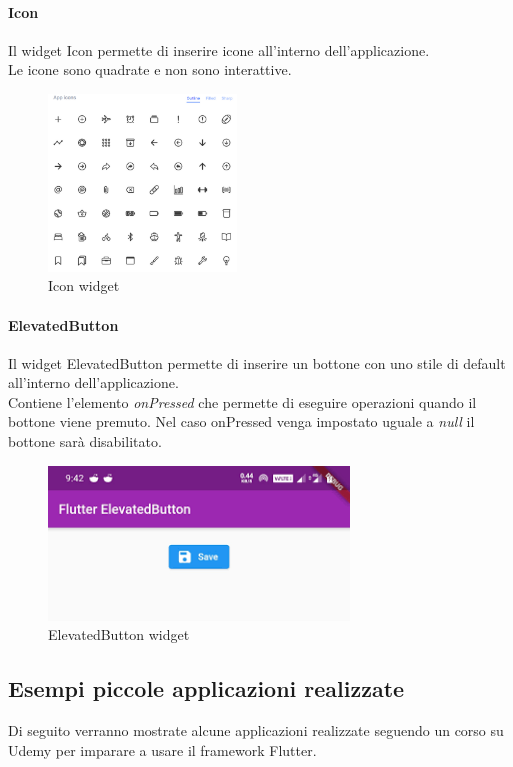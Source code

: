 \paragraph{Icon}
Il widget Icon permette di inserire icone all'interno dell'applicazione.\\
Le icone sono quadrate e non sono interattive.
\begin{figure}[htbp]	
	\centering
	\includegraphics[width=5cm]{immagini/icon.png}
	\caption{Icon widget}
	\label{fig:Icon widget}
\end{figure}

\paragraph{ElevatedButton}
Il widget ElevatedButton permette di inserire un bottone con uno stile di default all'interno dell'applicazione.\\
Contiene l'elemento \textit{onPressed} che permette di eseguire operazioni quando il bottone viene premuto. Nel caso onPressed venga impostato uguale a \textit{null} il bottone sarà disabilitato.
\begin{figure}[htbp]	
	\centering
	\includegraphics[width=8cm]{immagini/button.png}
	\caption{ElevatedButton widget}
	\label{fig:ElevatedButton widget}
\end{figure}

\newpage

\subsection{Esempi piccole applicazioni realizzate}
Di seguito verranno mostrate alcune applicazioni realizzate seguendo un corso su Udemy \cite{corso} per imparare a usare il framework Flutter.

